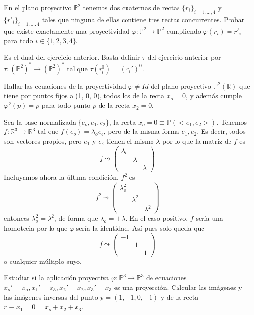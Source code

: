 \begin{ejer}
    [4] En el plano proyectivo $\mathbb P^2$ tenemos dos cuaternas de rectas $\{r_i\}_{i=1,...,4}$ y $\{r'_
i\}_{i=1,...,4}$ tales que ninguna de ellas contiene tres rectas concurrentes. Probar que existe exactamente una proyectividad $\varphi : \mathbb P^2 \to \mathbb P^2$ cumpliendo $\varphi(r_i) = r'_i$ para todo $i \in \{1, 2, 3, 4\}$.
\end{ejer}
\begin{sol}
    Es el dual del ejercicio anterior. Basta definir $\tau$ del ejercicio anterior por $\tau: (\mathbb P^2)^* \longrightarrow (\mathbb P^2)^*$ tal que $\tau(r_i^0) = (r_i')^0$. 
\end{sol}
\begin{ejer}
    [9] Hallar las ecuaciones de la proyectividad $\varphi \neq Id$ del plano proyectivo $\mathbb P^2(\mathbb R)$ que tiene por puntos fijos a (1, 0, 0), todos los de la recta $x_o = 0$, y adem\'as cumple $\varphi^2 (p) = p$ para todo punto $p$ de la recta $x_2 = 0$.
\end{ejer}\begin{sol} Sea la base normalizada $\{e_o,e_1,e_2\}$, la recta $x_o=0 \equiv \mathbb P(<e_1,e_2>)$. Tenemos $f: \mathbb R^3 \longrightarrow \mathbb R^3$ tal que $f(e_o)=\lambda_o e_o$, pero de la misma forma $e_1, e_2$. Es decir, todos son vectores propios, pero $e_1$ y $e_2$ tienen el mismo $\lambda$ por lo que la matriz de $f$ es 
$$f\leadsto \begin{pmatrix}
    \lambda_o \\ & \lambda \\ & & \lambda
\end{pmatrix}$$
Incluyamos ahora la \'ultima condici\'on. $f^2$ es 
$$f^2 \leadsto \begin{pmatrix}
    \lambda_o^2 \\ & \lambda^2 \\ & & \lambda^2
\end{pmatrix}$$
entonces $\lambda_o^2=\lambda^2$, de forma que $\lambda_o=\pm \lambda$. En el caso positivo, $f$ ser\'ia una homotecia por lo que $\varphi$ ser\'ia la identidad. As\'i pues solo queda que 
$$f \leadsto \begin{pmatrix}
    -1 \\ & 1 \\ & & 1
\end{pmatrix}$$
o cualquier m\'ultiplo suyo.
\end{sol}
\begin{ejer}
    [10] Estudiar si la aplicaci\'on proyectiva $\varphi: \mathbb P^3 \to \mathbb P^3$ de ecuaciones $x_o'=x_o, x_1'=x_3, x_2'=x_2, x_3'=x_3$ es una proyecci\'on. Calcular las im\'agenes y las im\'agenes inversas del punto $p = (1, -1, 0, -1)$ y de la recta $r \equiv x_1 = 0 = x_o + x_2 + x_3$.
\end{ejer}
